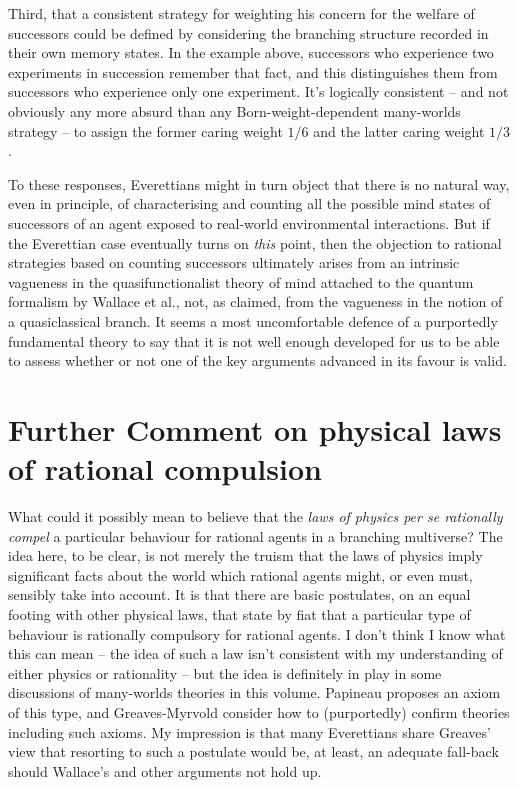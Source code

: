 \documentclass[aps,
pra,epsfig,12pt,nofootinbib]{revtex4}
\begin{document}
Third, that a consistent strategy for weighting his concern for the 
welfare of successors could be defined by considering the branching 
structure recorded in their own memory states.   In the example
above, successors who
experience two experiments in succession remember that fact, and 
this distinguishes them from successors who experience only one
experiment.  It's logically consistent -- and not obviously any
more absurd than any Born-weight-dependent many-worlds strategy -- to assign
the former caring weight $1/6$ and the latter caring weight $1/3$. 

To these responses, Everettians might in turn object
that there is no natural way,
even in principle, of characterising and counting all the possible
mind states of successors of an agent exposed to real-world
environmental interactions.  But if the Everettian case eventually
turns on {\it this} point, then 
the objection to rational strategies based on counting successors
ultimately arises from an intrinsic vagueness in the quasifunctionalist 
theory of mind attached to the quantum formalism by Wallace et al.,
not, as claimed, from the vagueness in the notion of a quasiclassical
branch.  It seems a most uncomfortable defence of a
purportedly fundamental theory to say that it is not well enough developed
for us to be able to assess whether or not one of the key arguments
advanced in its favour is valid.  

\section{Further Comment on physical laws of rational 
compulsion}\label{rationalconstraint}

What could it possibly mean to 
believe that the {\it laws of physics per se rationally compel} 
a particular behaviour for rational agents in a branching multiverse?   
The idea here, to be clear, is not merely the truism that the laws of physics 
imply significant facts about the world
which rational agents might, or even must, sensibly take into account. 
It is that there are basic postulates, on an equal footing
with other physical laws, that state by fiat that a particular type of
behaviour is rationally compulsory for rational agents.   
I don't think I know what this can mean -- 
the idea of such a law isn't consistent with my understanding of 
either physics or rationality -- but the 
idea is definitely in play in 
some discussions of many-worlds theories in this volume.  
Papineau \cite{papineauvol} 
proposes an axiom of this type, and Greaves-Myrvold \cite{greavesmyrvoldvol}
consider how to (purportedly) confirm theories including such 
axioms.   My impression is that many
Everettians share Greaves' view \cite{greaves} that resorting to such a 
postulate would be, at least, an adequate fall-back 
should Wallace's \cite{wallacevoltwo} and other
arguments not hold up.   
\end{document}
